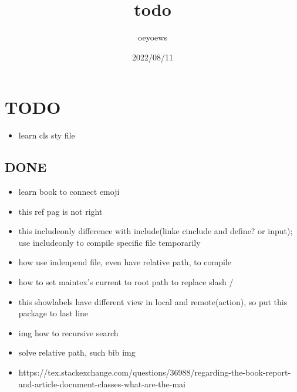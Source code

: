 \documentclass[UTF8]{article}
\title{todo \emoji{check-mark-button}}
\author{oeyoews}
\date{2022/08/11}
\begin{document}
\maketitle

\section{ TODO }%
\label{sec:TODO}

\begin{itemize}
  \item learn cls sty file
\end{itemize}

\subsection{ DONE}%
\label{sec:DONE}

\begin{itemize}
	\item learn book to connect emoji
	\item this ref pag is not right
	\item this includeonly difference with include(linke cinclude and define? or
    input); use includeonly to compile specific file temporarily
	\item how use indenpend file, even have relative path, to compile
	\item how to set maintex's current to root path to replace slash /
	\item this showlabels have different view in local and remote(action), so put
	      this package to last line
	\item img how to recursive search
	\item solve relative path, such bib img
	\item https://tex.stackexchange.com/questions/36988/regarding-the-book-report-and-article-document-classes-what-are-the-mai
\end{itemize}
\end{document}
